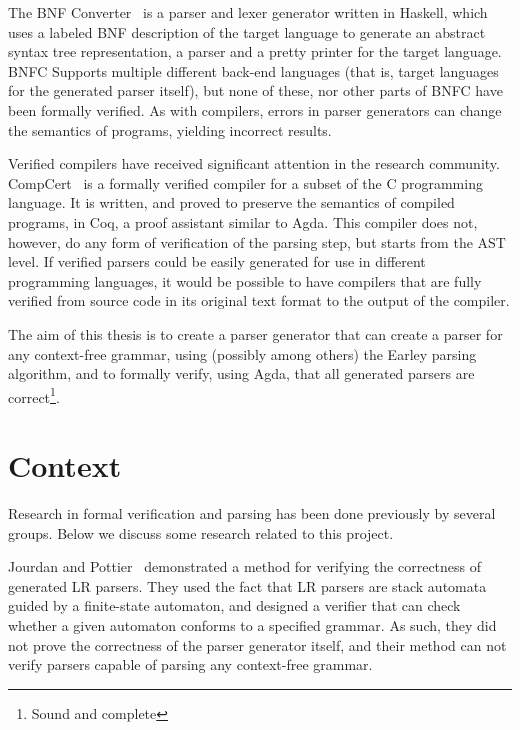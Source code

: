 \documentclass{article}
\begin{document}
	The BNF Converter~\cite{BNFC} is a parser and lexer generator written in
	Haskell, which uses a labeled BNF description of the target language to
	generate an abstract syntax tree representation, a parser and a pretty
	printer for the target language. BNFC Supports multiple different back-end
	languages (that is, target languages for the generated parser itself), but
	none of these, nor other parts of BNFC have been formally verified. As with
	compilers, errors in parser generators can change the semantics of
	programs, yielding incorrect results.



	Verified compilers have received significant attention in the research
	community. CompCert~\cite{Leroy} is a formally verified compiler for a
	subset of the C programming language. It is written, and proved to preserve
	the semantics of compiled programs, in Coq, a proof assistant similar to
	Agda. This compiler does not, however, do any form of verification of the
	parsing step, but starts from the AST level. If verified parsers could be
	easily generated for use in different programming languages, it would be
	possible to have compilers that are fully verified from source code in its
	original text format to the output of the compiler.

	The aim of this thesis is to create a parser generator that can create a
	parser for any context-free grammar, using (possibly among others) the
	Earley parsing algorithm, and to formally verify, using Agda, that all
	generated parsers are correct\footnote{Sound and complete}.


\section{Context}

	Research in formal verification and parsing has been done previously by
	several groups. Below we discuss some research related to this project.

	Jourdan and Pottier~\cite{Jourdan} demonstrated a method for verifying the
	correctness of generated LR parsers. They used the fact that LR parsers are
	stack automata guided by a finite-state automaton, and designed a verifier
	that can check whether a given automaton conforms to a specified grammar.
	As such, they did not prove the correctness of the parser generator itself,
	and their method can not verify parsers capable of parsing any context-free
	grammar.
\end{document}
